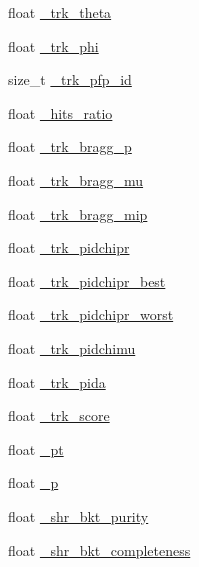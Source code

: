 \begin{DoxyCompactItemize}
\item 
float \hyperlink{classselection_1_1CC0piNpSelection_a08cd38de74e9611829a3580a310c19f2}{\-\_\-trk\-\_\-theta}
\item 
float \hyperlink{classselection_1_1CC0piNpSelection_a85a6029e249e3ff20ea6d8eaabf22142}{\-\_\-trk\-\_\-phi}
\item 
size\-\_\-t \hyperlink{classselection_1_1CC0piNpSelection_a641e7e656a28a5b31a5c8ab21dad9d3b}{\-\_\-trk\-\_\-pfp\-\_\-id}
\item 
float \hyperlink{classselection_1_1CC0piNpSelection_a32b43003c9168115bc94544049e439a2}{\-\_\-hits\-\_\-ratio}
\item 
float \hyperlink{classselection_1_1CC0piNpSelection_a52d578481ee7dd4fed45f8e3c8ed44da}{\-\_\-trk\-\_\-bragg\-\_\-p}
\item 
float \hyperlink{classselection_1_1CC0piNpSelection_a9e7b081beb0ef9129f15a7fb965276f1}{\-\_\-trk\-\_\-bragg\-\_\-mu}
\item 
float \hyperlink{classselection_1_1CC0piNpSelection_aec1e4d27216773ec40bc66ab5c217abc}{\-\_\-trk\-\_\-bragg\-\_\-mip}
\item 
float \hyperlink{classselection_1_1CC0piNpSelection_a712eaf6dc6086f1be5705a3bbe5226fc}{\-\_\-trk\-\_\-pidchipr}
\item 
float \hyperlink{classselection_1_1CC0piNpSelection_aaf0a2841494bc52da55d267bc3c8db3d}{\-\_\-trk\-\_\-pidchipr\-\_\-best}
\item 
float \hyperlink{classselection_1_1CC0piNpSelection_a6c06ff43f89cbee19cf466b830a6fe38}{\-\_\-trk\-\_\-pidchipr\-\_\-worst}
\item 
float \hyperlink{classselection_1_1CC0piNpSelection_a74ddf5622f3ee32110e9342361020a89}{\-\_\-trk\-\_\-pidchimu}
\item 
float \hyperlink{classselection_1_1CC0piNpSelection_af0fe49227e33b3f46015a821de58ba1f}{\-\_\-trk\-\_\-pida}
\item 
float \hyperlink{classselection_1_1CC0piNpSelection_a72517a224dc19f95faef3efde9a999d1}{\-\_\-trk\-\_\-score}
\item 
float \hyperlink{classselection_1_1CC0piNpSelection_a98281b58b33ff8c03fa9b00f3f3baa06}{\-\_\-pt}
\item 
float \hyperlink{classselection_1_1CC0piNpSelection_afae64b232d6b3526032b289c91b092cb}{\-\_\-p}
\item 
float \hyperlink{classselection_1_1CC0piNpSelection_a1da68886d5b7a5b4eb1785649c48e8ef}{\-\_\-shr\-\_\-bkt\-\_\-purity}
\item 
float \hyperlink{classselection_1_1CC0piNpSelection_ac3c3c9895ca501c3b73f14addfddf495}{\-\_\-shr\-\_\-bkt\-\_\-completeness}

\end{DoxyCompactItemize}
